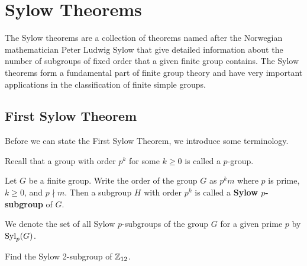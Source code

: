 \chapter{Sylow Theorems}
The Sylow theorems are a collection of theorems named after the Norwegian mathematician Peter Ludwig Sylow that give detailed information about the number of subgroups of fixed order that a given finite group contains. The Sylow theorems form a fundamental part of finite group theory and have very important applications in the classification of finite simple groups.

\section{First Sylow Theorem}
Before we can state the First Sylow Theorem, we introduce some terminology.

Recall that a group with order $p^k$ for some $k \geq 0$ is called a $p$-group.

\begin{definition}\label{definition-sylow-p-subgroup}
    Let $G$ be a finite group. Write the order of the group $G$ as $p^k m$ where $p$ is prime, $k \geq 0$, and $p \nmid m$. Then a subgroup $H$ with order $p^k$ is called a \textbf{Sylow $p$-subgroup} of $G$.
\end{definition}
We denote the set of all Sylow $p$-subgroups of the group $G$ for a given prime $p$ by $\mathrm{Syl}_{p}(G)$.

\begin{exercise}
    Find the Sylow 2-subgroup of $\mathbb{Z}_{12}$.
\end{exercise}

